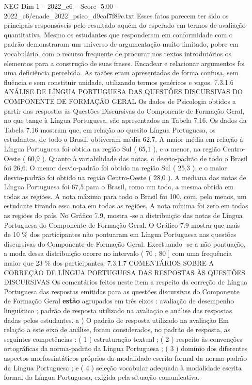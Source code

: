 \begin{textsample}{NEG Dim 1 – 2022\_c6 – Score -5.00 – 2022\_c6/enade\_2022\_psico\_d9caf7f89c.txt}
Esses fatos parecem ter sido os principais responsáveis pelo resultado aquém do esperado em termos de avaliação quantitativa.
Mesmo os estudantes que responderam em conformidade com o padrão demonstraram um universo de argumentação muito limitado, pobre em vocabulário, com o recurso frequente de procurar nos textos introdutórios os elementos para a construção de suas frases.
Encadear e relacionar argumentos foi uma deficiência percebida.
As razões eram apresentadas de forma confusa, sem fluência e sem constituir unidade, utilizando termos genéricos e vagos. 7.3.1.6 ANÁLISE DE LÍNGUA PORTUGUESA DAS QUESTÕES DISCURSIVAS DO COMPONENTE DE FORMAÇÃO GERAL Os dados de Psicologia obtidos a partir das respostas às Questões Discursivas do Componente de Formação Geral, no que tange à Língua Portuguesa, são apresentados na Tabela 7.16.
Os dados da Tabela 7.16 mostram que, em relação ao quesito Língua Portuguesa, os estudantes, de todo o Brasil, obtiveram média 62,7.
A maior média em relação à Língua Portuguesa foi obtida na região Sul ( 65,1 ), e a menor, na região Centro-Oeste ( 60,9 ).
Quanto à variabilidade das notas, o desvio-padrão de todo o Brasil foi 26,6.
O menor desvio-padrão foi obtido na região Sul ( 25,3 ), e o maior desvio-padrão foi obtido na região Centro-Oeste ( 28,0 ).
A mediana das notas de Língua Portuguesa foi 67,5 para o Brasil, como um todo, a mesma obtida em todas as regiões.
A nota máxima para todo o Brasil foi 100, com, pelo menos, um estudante tirando essa nota em todas as regiões.
A nota mínima foi zero em todas as regiões do país.
No Gráfico 7.9, mostra -se a distribuição das notas de Língua Portuguesa do Componente de Formação Geral.
O Gráfico 7.9 mostra que mais de 10 \% dos participantes não pontuaram em Língua Portuguesa nas questões discursivas do Componente de Formação Geral.
Excetuando -se a não pontuação, a moda dessa distribuição ocorre no intervalo ( 70 ; 80 ] com uma frequência maior que 23 \% dos participantes. 7.3.1.7 COMENTÁRIOS SOBRE A CORREÇÃO DE LÍNGUA PORTUGUESA DAS RESPOSTAS ÀS QUESTÕES DISCURSIVAS Os comentários feitos neste item a respeito da correção de Língua Portuguesa das respostas emitidas para as questões discursivas do Componente de Formação Geral \textbf{estão} agrupados em três eixos : avaliação de desempenho linguístico ; padrão de resposta utilizado na avaliação e análise das respostas dadas pelos estudantes. a ) O padrão de resposta utilizado na avaliação Em relação a este eixo de análise, foram considerados, no padrão de resposta, as seguintes competências : ( 1 ) estruturação textual ; ( 2 ) respeito às convenções ortográficas da norma-padrão da Língua Portuguesa ; ( 3 ) domínio dos diferentes aspectos morfossintáticos próprios da modalidade escrita formal da norma-padrão da Língua Portuguesa ; e ( 4 ) seleção vocabular adequada à modalidade escrita formal da Língua Portuguesa, exigida pela situação comunicativa.

\end{textsample}
